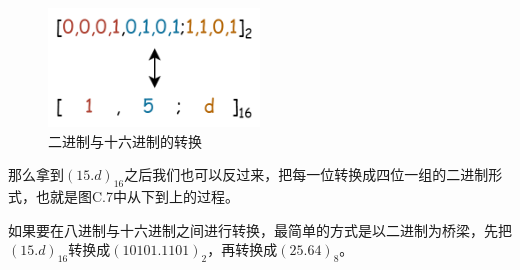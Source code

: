 \begin{figure}[htbp]
    \centering
    \includegraphics[width=0.5\textwidth]{../images/other_parts/C_bin_to_hex_300.png}
    \caption{二进制与十六进制的转换}
\end{figure}
那么拿到$(15.d)_{16}$之后我们也可以反过来，把每一位转换成四位一组的二进制形式，也就是图C.7中从下到上的过程。\par
如果要在八进制与十六进制之间进行转换，最简单的方式是以二进制为桥梁，先把$(15.d)_{16}$转换成$(10101.1101)_2$，再转换成$(25.64)_8$。\par
